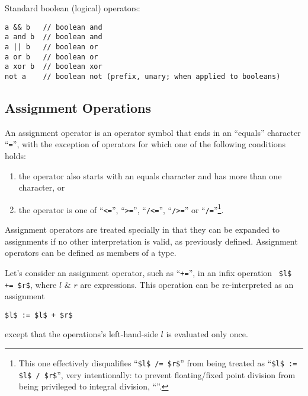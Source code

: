 Standard boolean (logical) operators:
\begin{lstlisting}
a && b   // boolean and
a and b  // boolean and
a || b   // boolean or
a or b   // boolean or
a xor b  // boolean xor
not a    // boolean not (prefix, unary; when applied to booleans)
\end{lstlisting}






\subsection{Assignment Operations}
\label{sec:assignment-operations}

An assignment operator is an operator symbol that ends in an ``equals'' character ``\lstinline!=!'', with the exception of operators for which one of the following conditions holds: 
\begin{enumerate}
\item the operator also starts with an equals character and has more than one character, or
\item the operator is one of ``\lstinline!<=!'', ``\lstinline!>=!'', ``\lstinline!/<=!'', ``\lstinline!/>=!'' or ``\lstinline!/=!''\footnote{This one effectively disqualifies ``\lstinline!$l$ /= $r$!'' from being treated as ``\lstinline!$l$ := $l$ / $r$!'', very intentionally: to prevent floating/fixed point division from being privileged to integral division, ``''.}.
\end{enumerate}

Assignment operators are treated specially in that they can be expanded to assignments if no other interpretation is valid, as previously defined. Assignment operators can be defined as members of a type. 

Let's consider an assignment operator, such as ``\lstinline!+=!'', in an infix operation ~\lstinline!$l$ += $r$!, where $l$ \& $r$ are expressions. This operation can be re-interpreted as an assignment
\begin{lstlisting}
$l$ := $l$ + $r$
\end{lstlisting}
except that the operations's left-hand-side $l$ is evaluated only once. 

